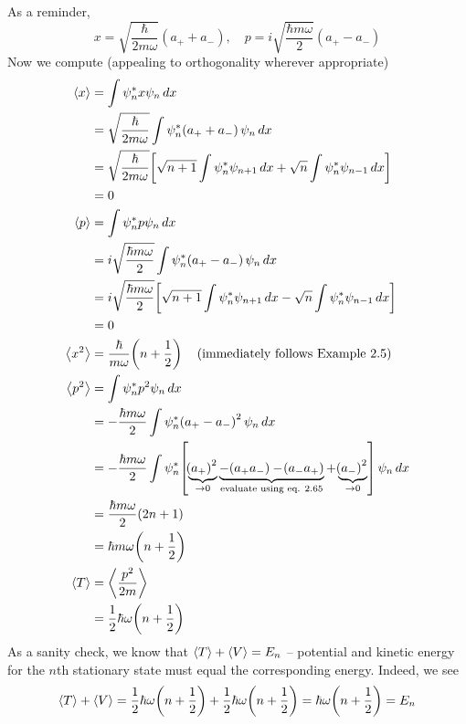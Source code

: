 \documentclass[a4paper]{article}
\begin{document}

As a reminder,
\[
	x = \sqrt{\frac{\hbar}{2m \omega}}\!\left( a_{+} + a_{-} \right), \quad p = i \sqrt{\frac{\hbar m \omega}{2}}\!\left( a_{+} - a_{-} \right) 
\]
Now we compute (appealing to orthogonality wherever appropriate)
\begin{align*}
	\braket{x} & = \int \psi_{n}^{*}x \psi_{n} \, dx \\
	 & = \sqrt{\frac{\hbar}{2m \omega}}\int \psi_{n}^{*}\!\left( a_{+} + a_{-} \right)\psi_{n} \, dx \\ 
	 & = \sqrt{\frac{\hbar}{2m \omega}}\!\left[ \sqrt{n + 1}\int \psi_{n}^{*}\psi_{n + 1} \, dx + \sqrt{n}\int \psi_{n}^{*}\psi_{n - 1} \, dx \right] \\
	 & = 0 \\
	\braket{p} & = \int \psi_{n}^{*}p \psi_{n} \, dx \\
		   & = i \sqrt{\frac{\hbar m \omega}{2}}\int \psi_{n}^{*}\!\left( a_{+} - a_{-} \right)\psi_{n} \, dx \\
		   & = i \sqrt{\frac{\hbar m \omega}{2}}\!\left[ \sqrt{n + 1}\int \psi_{n}^{*}\psi_{n + 1} \, dx - \sqrt{n}\int \psi_{n}^{*}\psi_{n - 1} \, dx \right] \\
		   & = 0 \\
	\braket{x^{2}} & = \frac{\hbar}{m \omega}\!\left( n + \frac{1}{2} \right) \quad (\text{immediately follows Example 2.5}) \\
	\braket{p^{2}} & = \int \psi_{n}^{*}p^{2}\psi_{n} \, dx \\
		       & = -\frac{\hbar m \omega}{2}\int \psi_{n}^{*}\!\left( a_{+} - a_{-} \right)^{2}\psi_{n} \, dx \\
		       & = -\frac{\hbar m \omega}{2}\int \psi_{n}^{*}\!\left[ \underbrace{\!\left( a_{+} \right)^{2}}_{\rightarrow 0} \underbrace{- \!\left( a_{+}a_{-} \right) - \!\left( a_{-}a_{+} \right)}_{\text{evaluate using eq. 2.65}} + \underbrace{\!\left( a_{-} \right)^{2}}_{\rightarrow 0} \right]\psi_{n} \, dx \\
		       & = \frac{\hbar m \omega}{2}\!\left( 2n + 1 \right) \\
		       & = \hbar m \omega \!\left( n + \frac{1}{2} \right) \\
	\braket{T} & = \braket{\frac{p^{2}}{2m}} \\
		   & = \frac{1}{2}\hbar \omega \!\left( n + \frac{1}{2} \right)
\end{align*}
As a sanity check, we know that \( \braket{T} + \braket{V} = E_{n} \) -- potential and kinetic energy for the \( n \)th stationary state must equal the corresponding energy. Indeed, we see
\[
	\braket{T} + \braket{V} = \frac{1}{2}\hbar \omega \!\left( n + \frac{1}{2} \right) + \frac{1}{2}\hbar \omega \!\left( n + \frac{1}{2} \right) = \hbar \omega \!\left( n + \frac{1}{2} \right) = E_{n} 
\]
\end{document}
